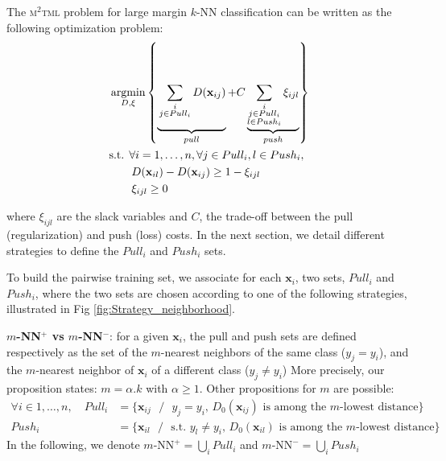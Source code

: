 The \textsc{m$^2$tml} problem for large margin $k$-NN classification can be written as the following optimization problem:
\begin{equation}
\begin{aligned}
&\displaystyle 		\argmin_{D,\xi} \left\lbrace \underbrace{
	\vphantom{ \sum\limits_{\substack{i \\ j \in Pull_i \\ l \in Push_i}}  \xi_{ijl} }
	\sum_{\substack{i \\ j \in Pull_i}}D(\textbf{x}_{ij})
}_{pull}
+ C
\underbrace{
	\sum\limits_{\substack{i \\ j \in Pull_i \\ l \in Push_i}} \xi_{ijl}
}
_{push} \right\rbrace  \\
&\text{s.t.  } \forall i = 1, \ldots, n, \forall j \in Pull_i, l \in Push_i, \\
& \qquad D(\textbf{x}_{il})-D(\textbf{x}_{ij}) \geq 1-\xi_{ijl} \\
& \qquad \xi_{ijl} \geq 0 
\label{eq:OriginalOptimizationProblem_Objective} 
\end{aligned}
\end{equation}

\noindent where $\xi_{ijl}$ are the slack variables and $C$, the trade-off between the pull (regularization) and push (loss) costs. In the next section, we detail different strategies to define the $Pull_i$ and $Push_i$ sets. 

To build the pairwise training set, we associate for each $\textbf{x}_i$, two sets, $Pull_i$ and $Push_i$, where the two sets are chosen according to one of the following strategies, illustrated in Fig \ref{fig:Strategy_neighborhood}. 

\textbf{$m$-NN$^+$ vs $m$-NN$^-$}: for a given $\textbf{x}_i$, the pull and push sets are defined respectively as 
the set of the $m$-nearest neighbors of the same class ($y_j=y_i$), 
and the $m$-nearest neighbor of $\textbf{x}_i$ of a different class ($y_j \neq y_i$)
More precisely, our proposition states: $m=\alpha.k$ with $\alpha \geq 1$. Other propositions for $m$ are possible:
\begin{align}
	\forall i\in 1, \ldots, n, \quad Pull_i & = \{\textbf{x}_{ij} \text{ } / \text{ } \text{$y_j = y_i$, $D_0(\textbf{x}_{ij})$ is among the $m$-lowest distance} \} \label{eq:mnn+}\\
	Push_i & = \{\textbf{x}_{il} \text{ } / \text{ } \text{s.t. $y_l \neq y_i$, $D_0(\textbf{x}_{il})$ is among the $m$-lowest distance} \} \label{eq:mnn-}
\end{align}
In the following, we denote $m\text{-NN}^+ = \bigcup\limits_{i} Pull_i$ and $m\text{-NN}^- = \bigcup\limits_{i} Push_i$


